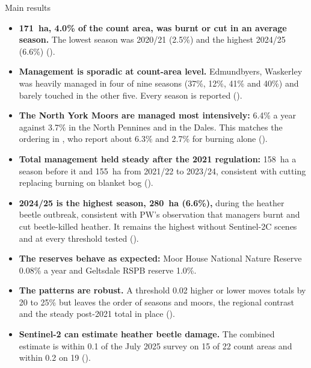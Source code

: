 \documentclass[11pt,a4paper]{article}
\begin{document}
\begin{keybox}{Main results}
\begin{itemize}
\item \textbf{171~ha, 4.0\% of the count area, was burnt or cut in an average season.} The lowest season was 2020/21 (2.5\%) and the highest 2024/25 (6.6\%) ().
\item \textbf{Management is sporadic at count-area level.} Edmundbyers, Waskerley was heavily managed in four of nine seasons (37\%, 12\%, 41\% and 40\%) and barely touched in the other five. Every season is reported ().
\item \textbf{The North York Moors are managed most intensively:} 6.4\% a year against 3.7\% in the North Pennines and in the Dales. This matches the ordering in \citet{shewring2024}, who report about 6.3\% and 2.7\% for burning alone ().
\item \textbf{Total management held steady after the 2021 regulation:} 158~ha a season before it and 155~ha from 2021/22 to 2023/24, consistent with cutting replacing burning on blanket bog ().
\item \textbf{2024/25 is the highest season, 280~ha (6.6\%),} during the heather beetle outbreak, consistent with PW's observation that managers burnt and cut beetle-killed heather. It remains the highest without Sentinel-2C scenes and at every threshold tested ().
\item \textbf{The reserves behave as expected:} Moor House National Nature Reserve 0.08\% a year and Geltsdale RSPB reserve 1.0\%.
\item \textbf{The patterns are robust.} A threshold 0.02 higher or lower moves totals by 20 to 25\% but leaves the order of seasons and moors, the regional contrast and the steady post-2021 total in place ().
\item \textbf{Sentinel-2 can estimate heather beetle damage.} The combined estimate is within 0.1 of the July 2025 survey on 15 of 22 count areas and within 0.2 on 19 ().
\end{itemize}
\end{keybox}
\end{document}
